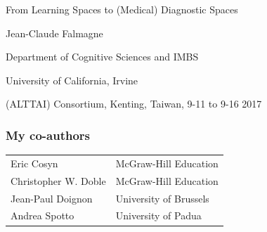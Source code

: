 \documentclass{beamer}
\def\vtl{\vskip 1mm}
\def\wl{\vskip 4mm}
\def\pha{\phantom}
\begin{document}
\begin{frame}{}
\vspace{2cm}


\centerline{\large From Learning Spaces to (Medical)  Diagnostic Spaces}

\wl
\wl
\centerline{\small Jean-Claude Falmagne}
\vtl
\centerline{\small Department of Cognitive Sciences and IMBS}
\vtl
\centerline {\small University of California, Irvine}
\vtl
\centerline{ }
\vspace{2cm}

\hfill {\small (ALTTAI) Consortium, Kenting, Taiwan,  9-11 to 9-16 2017}
\end{frame}
  \begin{frame}
  \frametitle{My co-authors}
  \begin{tabular}{ll}
  Eric Cosyn\pha{xxxxxxxxxxxx}& McGraw-Hill Education\\[2mm]
  Christopher W. Doble& McGraw-Hill Education\\[2mm]
Jean-Paul Doignon&University of Brussels\\[2mm]
Andrea Spotto&University of Padua
\end{tabular}
\vspace{2cm}

  \end{frame}
\end{document}
